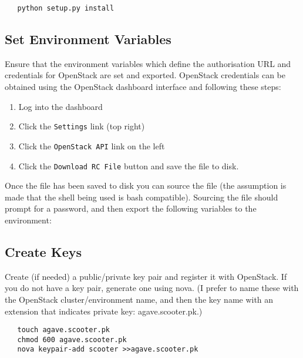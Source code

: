 \small\begin{verbatim}
   python setup.py install
\end{verbatim}\normalsize

\subsection{Set Environment Variables}
Ensure that the environment variables which define the authorisation URL and credentials for OpenStack are set and exported.
OpenStack credentials can be obtained using the OpenStack dashboard interface and following these steps:
\label{set_env_sect}
%
\begin{enumerate}
\item Log into the dashboard
\item Click the \verb!Settings! link (top right)
\item Click the \verb!OpenStack API! link on the left
\item Click the \verb!Download RC File! button and save the file to disk.
\end{enumerate}
%
Once the file has been saved to disk you can source the file (the assumption is made that the
shell being used is bash compatible).
Sourcing the file should prompt for a password, and then export the following variables to the environment:


\dlbeg{1.2in}




\dlend

\subsection{Create Keys}
Create (if needed) a public/private key pair and register it with OpenStack.   If you do not have a key pair, generate one using
nova. (I prefer to name these with the OpenStack cluster/environment name, and then the key name with an extension that
indicates private key: agave.scooter.pk.)

\small\begin{verbatim}
   touch agave.scooter.pk
   chmod 600 agave.scooter.pk
   nova keypair-add scooter >>agave.scooter.pk
\end{verbatim}\normalsize

